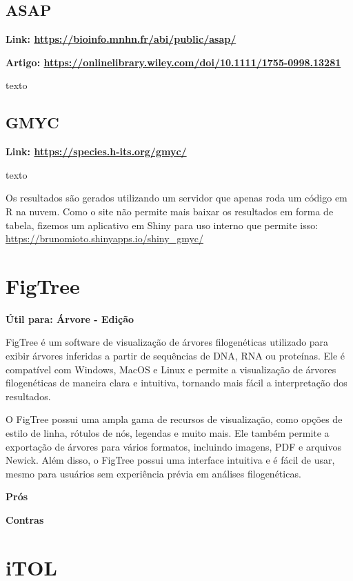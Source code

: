 \documentclass[
  letterpaper,
  DIV=11,
  numbers=noendperiod]{scrreprt}
\begin{document}
\hypertarget{asap}{%
\subsection{ASAP}\label{asap}}

\textbf{Link: \url{https://bioinfo.mnhn.fr/abi/public/asap/}}

\textbf{Artigo:
\url{https://onlinelibrary.wiley.com/doi/10.1111/1755-0998.13281}}

texto

\hypertarget{gmyc}{%
\subsection{GMYC}\label{gmyc}}

\textbf{Link: \url{https://species.h-its.org/gmyc/}}

texto

Os resultados são gerados utilizando um servidor que apenas roda um
código em R na nuvem. Como o site não permite mais baixar os resultados
em forma de tabela, fizemos um aplicativo em Shiny para uso interno que
permite isso: \url{https://brunomioto.shinyapps.io/shiny_gmyc/}

\hypertarget{figtree}{%
\section{FigTree}\label{figtree}}

\textbf{Útil para: {Árvore - Edição}}

FigTree é um software de visualização de árvores filogenéticas utilizado
para exibir árvores inferidas a partir de sequências de DNA, RNA ou
proteínas. Ele é compatível com Windows, MacOS e Linux e permite a
visualização de árvores filogenéticas de maneira clara e intuitiva,
tornando mais fácil a interpretação dos resultados.

O FigTree possui uma ampla gama de recursos de visualização, como opções
de estilo de linha, rótulos de nós, legendas e muito mais. Ele também
permite a exportação de árvores para vários formatos, incluindo imagens,
PDF e arquivos Newick. Além disso, o FigTree possui uma interface
intuitiva e é fácil de usar, mesmo para usuários sem experiência prévia
em análises filogenéticas.

\textbf{Prós}

\textbf{Contras}

\hypertarget{itol}{%
\section{iTOL}\label{itol}}
\end{document}
